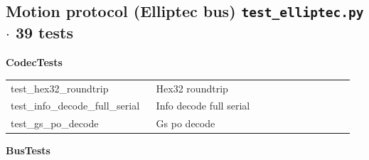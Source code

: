 \subsection{Motion protocol (Elliptec bus) \hfill \normalfont\small\color{soft2}\texttt{test\_elliptec.py} $\cdot$ 39 tests}
\par\smallskip \textbf{CodecTests}\par\nopagebreak\smallskip
\begin{longtable}{@{}>{\ttfamily\scriptsize\raggedright\arraybackslash}p{0.40\linewidth} >{\footnotesize\raggedright\arraybackslash}p{0.555\linewidth}@{}}
test\_\allowbreak{}hex32\_\allowbreak{}roundtrip & Hex32 roundtrip \\
test\_\allowbreak{}info\_\allowbreak{}decode\_\allowbreak{}full\_\allowbreak{}serial & Info decode full serial \\
test\_\allowbreak{}gs\_\allowbreak{}po\_\allowbreak{}decode & Gs po decode \\
\end{longtable}
\par\smallskip \textbf{BusTests}\par\nopagebreak\smallskip
